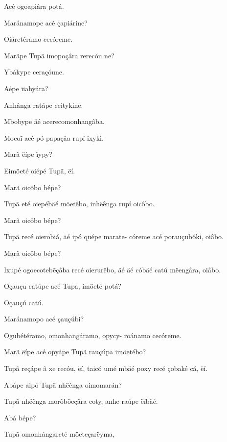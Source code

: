 \documentclass[openany,titlepage,12pt]{book}
\begin{document}
\begin{altereven}
    \item Acé ogoapiâra potá.
    \item Maránamope acé çapiárine?
    \item Oiáretéramo cecóreme.
    \item Marãpe Tupã imopoçâra rerecóu ne?
    \item Ybákype ceraçóune.
    \item Aépe ïiabyára?
    \item Anhânga ratápe ceitykine.
    \item Mbobype äé acerecomonhangâba.
    \item Moco\~i acé pó papaçâa rupí ixyki.
    \item Marã ëípe ïypy?
    \item Eimöeté oiépé Tupã, ëí.
    \item Marã oicôbo bépe?
    \item Tupã eté oiepébäé möetêbo, inhëênga\linebreak
        rupí oicôbo.
    \item Marã oicôbo bépe?
    \item Tupã recé oierobiá, äé ipó quépe marate-
        córeme acé porauçubôki, oiâbo.
    \item Marã oicôbo bépe?
    \item Ixupé ogoecoteb\~eçâba recé oierurêbo,\linebreak
        äé äé cóbäé catú mëengâra, oiâbo.
    \item Oçauçu catúpe acé Tupa, imöeté potá?
    \item Oçauçú catú.
    \item Maránamopo acé çauçúbi?
    \item Ogubétéramo, omonhangáramo, opycy-
        roánamo cecóreme.
    \item Marã ëípe acé opyápe Tupã rauçúpa\linebreak
        imöetébo?
    \item Tupã reçápe ã xe recóu, ëí, taicó umé\linebreak
    \newpage
        mbäé poxy recé çobaké cá, ëí.
    \item Abápe aipó Tupã nhëénga oimomarán?
    \item Tupã nhëênga morõböeçâra coty, anhe
        raúpe ëíbäé.
    \item Abá bépe?
    \item Tupã omonhángareté möeteçarëyma,\linebreak

\end{altereven}
\end{document}
